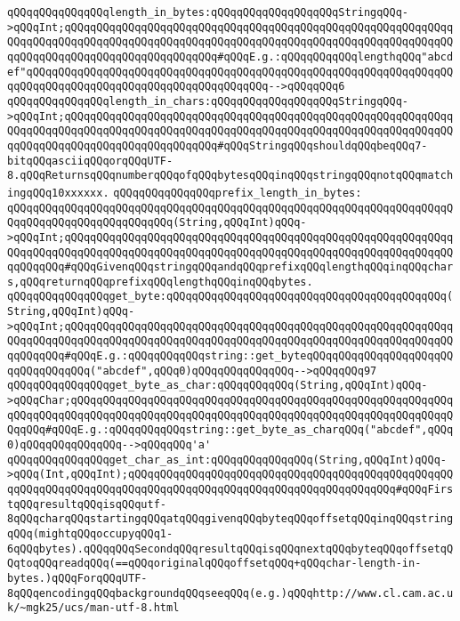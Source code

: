 \newline
\newline
\newline
\verb|qQQqqQQqqQQqqQQqlength_in_bytes:qQQqqQQqqQQqqQQqqQQqStringqQQq->qQQqInt;qQQqqQQqqQQqqQQqqQQqqQQqqQQqqQQqqQQqqQQqqQQqqQQqqQQqqQQqqQQqqQQqqQQqqQQqqQQqqQQqqQQqqQQqqQQqqQQqqQQqqQQqqQQqqQQqqQQqqQQqqQQqqQQqqQQqqQQqqQQqqQQqqQQqqQQqqQQqqQQqqQQq#qQQqE.g.:qQQqqQQqqQQqlengthqQQq"abcdef"qQQqqQQqqQQqqQQqqQQqqQQqqQQqqQQqqQQqqQQqqQQqqQQqqQQqqQQqqQQqqQQqqQQqqQQqqQQqqQQqqQQqqQQqqQQqqQQqqQQqqQQqqQQq-->qQQqqQQq6|\newline
\verb|qQQqqQQqqQQqqQQqlength_in_chars:qQQqqQQqqQQqqQQqqQQqStringqQQq->qQQqInt;qQQqqQQqqQQqqQQqqQQqqQQqqQQqqQQqqQQqqQQqqQQqqQQqqQQqqQQqqQQqqQQqqQQqqQQqqQQqqQQqqQQqqQQqqQQqqQQqqQQqqQQqqQQqqQQqqQQqqQQqqQQqqQQqqQQqqQQqqQQqqQQqqQQqqQQqqQQqqQQqqQQq#qQQqStringqQQqshouldqQQqbeqQQq7-bitqQQqasciiqQQqorqQQqUTF-8.qQQqReturnsqQQqnumberqQQqofqQQqbytesqQQqinqQQqstringqQQqnotqQQqmatchingqQQq10xxxxxx.|\newline
\verb|qQQqqQQqqQQqqQQqprefix_length_in_bytes:|\newline
\verb|qQQqqQQqqQQqqQQqqQQqqQQqqQQqqQQqqQQqqQQqqQQqqQQqqQQqqQQqqQQqqQQqqQQqqQQqqQQqqQQqqQQqqQQqqQQqqQQq(String,qQQqInt)qQQq->qQQqInt;qQQqqQQqqQQqqQQqqQQqqQQqqQQqqQQqqQQqqQQqqQQqqQQqqQQqqQQqqQQqqQQqqQQqqQQqqQQqqQQqqQQqqQQqqQQqqQQqqQQqqQQqqQQqqQQqqQQqqQQqqQQqqQQqqQQqqQQqqQQq#qQQqGivenqQQqstringqQQqandqQQqprefixqQQqlengthqQQqinqQQqchars,qQQqreturnqQQqprefixqQQqlengthqQQqinqQQqbytes.|\newline
\newline
\verb|qQQqqQQqqQQqqQQqget_byte:qQQqqQQqqQQqqQQqqQQqqQQqqQQqqQQqqQQqqQQqqQQq(String,qQQqInt)qQQq->qQQqInt;qQQqqQQqqQQqqQQqqQQqqQQqqQQqqQQqqQQqqQQqqQQqqQQqqQQqqQQqqQQqqQQqqQQqqQQqqQQqqQQqqQQqqQQqqQQqqQQqqQQqqQQqqQQqqQQqqQQqqQQqqQQqqQQqqQQqqQQqqQQq#qQQqE.g.:qQQqqQQqqQQqstring::get_byteqQQqqQQqqQQqqQQqqQQqqQQqqQQqqQQqqQQq("abcdef",qQQq0)qQQqqQQqqQQqqQQq-->qQQqqQQq97|\newline
\verb|qQQqqQQqqQQqqQQqget_byte_as_char:qQQqqQQqqQQq(String,qQQqInt)qQQq->qQQqChar;qQQqqQQqqQQqqQQqqQQqqQQqqQQqqQQqqQQqqQQqqQQqqQQqqQQqqQQqqQQqqQQqqQQqqQQqqQQqqQQqqQQqqQQqqQQqqQQqqQQqqQQqqQQqqQQqqQQqqQQqqQQqqQQqqQQqqQQq#qQQqE.g.:qQQqqQQqqQQqstring::get_byte_as_charqQQq("abcdef",qQQq0)qQQqqQQqqQQqqQQq-->qQQqqQQq'a'|\newline
\verb|qQQqqQQqqQQqqQQqget_char_as_int:qQQqqQQqqQQqqQQq(String,qQQqInt)qQQq->qQQq(Int,qQQqInt);qQQqqQQqqQQqqQQqqQQqqQQqqQQqqQQqqQQqqQQqqQQqqQQqqQQqqQQqqQQqqQQqqQQqqQQqqQQqqQQqqQQqqQQqqQQqqQQqqQQqqQQqqQQqqQQq#qQQqFirstqQQqresultqQQqisqQQqutf-8qQQqcharqQQqstartingqQQqatqQQqgivenqQQqbyteqQQqoffsetqQQqinqQQqstringqQQq(mightqQQqoccupyqQQq1-6qQQqbytes).qQQqqQQqSecondqQQqresultqQQqisqQQqnextqQQqbyteqQQqoffsetqQQqtoqQQqreadqQQq(==qQQqoriginalqQQqoffsetqQQq+qQQqchar-length-in-bytes.)qQQqForqQQqUTF-8qQQqencodingqQQqbackgroundqQQqseeqQQq(e.g.)qQQqhttp://www.cl.cam.ac.uk/~mgk25/ucs/man-utf-8.html|\newline
